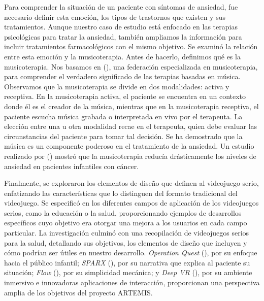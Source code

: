 Para comprender la situación de un paciente con síntomas de ansiedad, fue necesario definir esta emoción, los tipos de trastornos que existen y sus tratamientos. Aunque nuestro caso de estudio está enfocado en las terapias psicológicas para tratar la ansiedad, también ampliamos la información para incluir tratamientos farmacológicos con el mismo objetivo. Se examinó la relación entre esta emoción y la musicoterapia. Antes de hacerlo, definimos qué es la musicoterapia. Nos basamos en \citeauthor{WFMT:2024} (\citeyear{WFMT:2024}), una federación especializada en musicoterapia, para comprender el verdadero significado de las terapias basadas en música. Observamos que la musicoterapia se divide en dos modalidades: activa y receptiva. En la musicoterapia activa, el paciente se encuentra en un contexto donde él es el creador de la música, mientras que en la musicoterapia receptiva, el paciente escucha música grabada o interpretada en vivo por el terapeuta. La elección entre una u otra modalidad recae en el terapeuta, quien debe evaluar las circunstancias del paciente para tomar tal decisión. Se ha demostrado que la música es un componente poderoso en el tratamiento de la ansiedad. Un estudio realizado por \citeauthor{SEPULVEDA:2014} (\citeyear{SEPULVEDA:2014}) mostró que la musicoterapia reducía drásticamente los niveles de ansiedad en pacientes infantiles con cáncer.

Finalmente, se exploraron los elementos de diseño que definen al videojuego serio, enfatizando las características que lo distinguen del formato tradicional del videojuego. Se especificó en los diferentes campos de aplicación de los videojuegos serios, como la educación o la salud, proporcionando ejemplos de desarrollos específicos cuyo objetivo era otorgar una mejora a los usuarios en cada campo particular. La investigación culminó con una recopilación de videojuegos serios para la salud, detallando sus objetivos, los elementos de diseño que incluyen y cómo podrían ser útiles en nuestro desarrollo. \textit{Operation Quest} (\cite{OPERATIONQUEST:2024}), por su enfoque hacia el público infantil; \textit{SPARX} (\cite{SPARX:2013}), por su narrativa que explica al paciente su situación; \textit{Flow} (\cite{FLOW:2006}), por su simplicidad mecánica; y \textit{Deep VR} (\cite{DEEP:2021}), por su ambiente inmersivo e innovadoras aplicaciones de interacción, proporcionan una perspectiva amplia de los objetivos del proyecto ARTEMIS.

